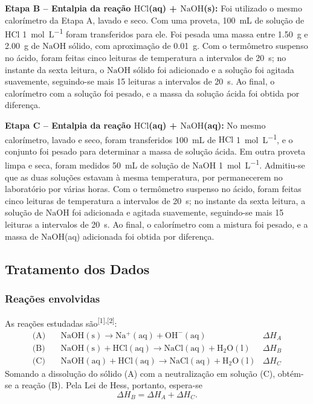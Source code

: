     \textbf{Etapa B -- Entalpia da reação $\mathrm{HCl}$(aq) + $\mathrm{NaOH}$(s):}
    Foi utilizado o mesmo calorímetro da Etapa A, lavado e seco. Com uma proveta, \SI{100}{mL} de solução de $\mathrm{HCl}$ \SI{1}{mol.L^{-1}} foram transferidos para ele. Foi pesada uma massa entre \SI{1,50}{g} e \SI{2,00}{g} de $\mathrm{NaOH}$ sólido, com aproximação de \SI{0,01}{g}. Com o termômetro suspenso no ácido, foram feitas cinco leituras de temperatura a intervalos de \SI{20}{s}; no instante da sexta leitura, o $\mathrm{NaOH}$ sólido foi adicionado e a solução foi agitada suavemente, seguindo-se mais 15 leituras a intervalos de \SI{20}{s}. Ao final, o calorímetro com a solução foi pesado, e a massa da solução ácida foi obtida por diferença.

    \textbf{Etapa C -- Entalpia da reação $\mathrm{HCl}$(aq) + $\mathrm{NaOH}$(aq):}
    No mesmo calorímetro, lavado e seco, foram transferidos \SI{100}{mL} de $\mathrm{HCl}$ \SI{1}{mol.L^{-1}}, e o conjunto foi pesado para determinar a massa de solução ácida. Em outra proveta limpa e seca, foram medidos \SI{50}{mL} de solução de $\mathrm{NaOH}$ \SI{1}{mol.L^{-1}}. Admitiu-se que as duas soluções estavam à mesma temperatura, por permanecerem no laboratório por várias horas. Com o termômetro suspenso no ácido, foram feitas cinco leituras de temperatura a intervalos de \SI{20}{s}; no instante da sexta leitura, a solução de $\mathrm{NaOH}$ foi adicionada e agitada suavemente, seguindo-se mais 15 leituras a intervalos de \SI{20}{s}. Ao final, o calorímetro com a mistura foi pesado, e a massa de $\mathrm{NaOH}$(aq) adicionada foi obtida por diferença.

 \subsection{Tratamento dos Dados}
 \subsubsection{Reações envolvidas}
 As reações estudadas são\textsuperscript{[1],[2]}:
 \begin{align*}
    \text{(A)}\quad & \mathrm{NaOH(s)} \longrightarrow \mathrm{Na^{+}(aq)} + \mathrm{OH^{-}(aq)} & \Delta H_A\\
    \text{(B)}\quad & \mathrm{NaOH(s)} + \mathrm{HCl(aq)} \longrightarrow \mathrm{NaCl(aq)} + \mathrm{H_2O(l)} & \Delta H_B\\
    \text{(C)}\quad & \mathrm{NaOH(aq)} + \mathrm{HCl(aq)} \longrightarrow \mathrm{NaCl(aq)} + \mathrm{H_2O(l)} & \Delta H_C
 \end{align*}
 Somando a dissolução do sólido (A) com a neutralização em solução (C), obtém-se a reação (B). Pela Lei de Hess, portanto, espera-se
 \[
    \Delta H_B = \Delta H_A + \Delta H_C .
 \]

